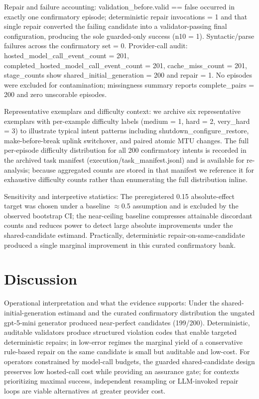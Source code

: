 \documentclass[conference]{IEEEtran}
\begin{document}
Repair and failure accounting: validation\_before.valid == false occurred in exactly one confirmatory episode; deterministic repair invocations = 1 and that single repair converted the failing candidate into a validator-passing final configuration, producing the sole guarded-only success (n10 = 1). Syntactic/parse failures across the confirmatory set = 0. Provider-call audit: hosted\_model\_call\_event\_count = 201, completed\_hosted\_model\_call\_event\_count = 201, cache\_miss\_count = 201, stage\_counts show shared\_initial\_generation = 200 and repair = 1. No episodes were excluded for contamination; missingness summary reports complete\_pairs = 200 and zero unscorable episodes.

Representative exemplars and difficulty context: we archive six representative exemplars with per-example difficulty labels (medium = 1, hard = 2, very\_hard = 3) to illustrate typical intent patterns including shutdown\_configure\_restore, make-before-break uplink switchover, and paired atomic MTU changes. The full per-episode difficulty distribution for all 200 confirmatory intents is recorded in the archived task manifest (execution/task\_manifest.jsonl) and is available for re-analysis; because aggregated counts are stored in that manifest we reference it for exhaustive difficulty counts rather than enumerating the full distribution inline.

Sensitivity and interpretive statistics: The preregistered 0.15 absolute-effect target was chosen under a baseline \ensuremath{\approx}0.5 assumption and is excluded by the observed bootstrap CI; the near-ceiling baseline compresses attainable discordant counts and reduces power to detect large absolute improvements under the shared-candidate estimand. Practically, deterministic repair-on-same-candidate produced a single marginal improvement in this curated confirmatory bank.

\section{Discussion}
Operational interpretation and what the evidence supports: Under the shared-initial-generation estimand and the curated confirmatory distribution the ungated gpt-5-mini generator produced near-perfect candidates (199/200). Deterministic, auditable validators produce structured violation codes that enable targeted deterministic repairs; in low-error regimes the marginal yield of a conservative rule-based repair on the same candidate is small but auditable and low-cost. For operators constrained by model-call budgets, the guarded shared-candidate design preserves low hosted-call cost while providing an assurance gate; for contexts prioritizing maximal success, independent resampling or LLM-invoked repair loops are viable alternatives at greater provider cost.
\end{document}
